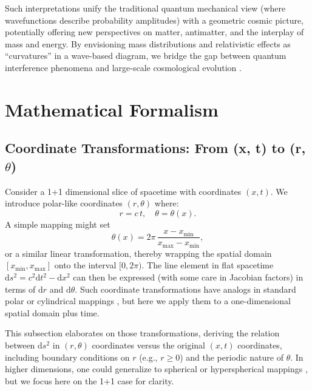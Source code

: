 \documentclass{article}
\begin{document}
Such interpretations unify the traditional quantum mechanical view 
(where wavefunctions describe probability amplitudes) with a geometric 
cosmic picture, potentially offering new perspectives on matter, antimatter, 
and the interplay of mass and energy. By envisioning mass distributions 
and relativistic effects as ``curvatures'' in a wave-based diagram, we 
bridge the gap between quantum interference phenomena and large-scale 
cosmological evolution \cite{penrose2004, susskind2008}.
\section{Mathematical Formalism}
\label{sec:math-formalism}

\subsection{Coordinate Transformations: From (x, t) to (r, \texorpdfstring{\(\theta\)}{theta})}
\label{subsec:coord-transform}
Consider a 1+1 dimensional slice of spacetime with coordinates \((x, t)\). 
We introduce polar-like coordinates \((r, \theta)\) where:
\[
  r = c \, t, 
  \quad
  \theta = \theta(x).
\]
A simple mapping might set
\[
  \theta(x) = 2\pi \, \frac{x - x_{\mathrm{min}}}{x_{\mathrm{max}} - x_{\mathrm{min}}}, 
\]
or a similar linear transformation, thereby wrapping the spatial domain 
\([x_{\mathrm{min}}, x_{\mathrm{max}}]\) onto the interval \([0, 2\pi)\). 
The line element in flat spacetime 
\(\mathrm{d}s^2 = c^2 \mathrm{d}t^2 - \mathrm{d}x^2\)
can then be expressed (with some care in Jacobian factors) in terms of 
\(\mathrm{d}r\) and \(\mathrm{d}\theta\). Such coordinate transformations 
have analogs in standard polar or cylindrical mappings \cite{rindler1977essential, misner1973}, 
but here we apply them to a one-dimensional spatial domain plus time.

This subsection elaborates on those transformations, deriving the 
relation between \(\mathrm{d}s^2\) in \((r, \theta)\) coordinates 
versus the original \((x, t)\) coordinates, including boundary conditions 
on \(r\) (e.g., \(r \ge 0\)) and the periodic nature of \(\theta\). 
In higher dimensions, one could generalize to spherical or hyperspherical 
mappings \cite{penrose2004}, but we focus here on the 1+1 case for clarity.
\end{document}
